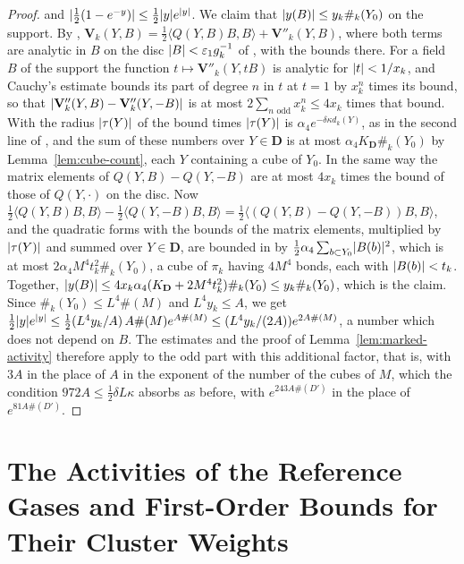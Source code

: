 \documentclass[11pt]{preprint}
\DeclarePairedDelimiter{\abs}{\lvert}{\rvert}
\numberwithin{equation}{section}
\theoremstyle{definition}
\theoremstyle{remark}
\theoremstyle{plain}
\begin{document}
\begin{proof}
and $\abs{\frac12(1 - e^{-y})} \leq \frac12\abs ye^{\abs y}$. We claim that $\abs{y(B)} \leq y_k\#_k(Y_0)$ on the support. By \cite[(1.42)]{BalabanRG2}, $\mathbf V_k(Y, B) = \frac12\langle Q(Y, B)B, B\rangle + \mathbf V''_k(Y, B)$, where both terms are analytic in $B$ on the disc $\abs B < \varepsilon_1g_k^{-1}$ of \cite[(1.34)]{BalabanRG2}, with the bounds \cite[(1.43), (1.36)]{BalabanRG2} there. For a field $B$ of the support the function $t \mapsto \mathbf V''_k(Y, tB)$ is analytic for $\abs t < 1/x_k$, and Cauchy's estimate bounds its part of degree $n$ in $t$ at $t = 1$ by $x_k^n$ times its bound, so that $\abs{\mathbf V''_k(Y, B) - \mathbf V''_k(Y, -B)}$ is at most $2\sum_{n \text{ odd}}x_k^n \leq 4x_k$ times that bound. With the radius $\abs{\tau(Y)}$ of \cite[(2.18)]{BalabanRG2} the bound \cite[(1.36)]{BalabanRG2} times $\abs{\tau(Y)}$ is $\alpha_4e^{-\delta\kappa d_k(Y)}$, as in the second line of \cite[(2.20)]{BalabanRG2}, and the sum of these numbers over $Y \in \mathbf D$ is at most $\alpha_4K_{\mathbf D}\#_k(Y_0)$ by Lemma~\ref{lem:cube-count}, each $Y$ containing a cube of $Y_0$. In the same way the matrix elements of $Q(Y, B) - Q(Y, -B)$ are at most $4x_k$ times the bound of those of $Q(Y, \cdot)$ on the disc. Now $\frac12\langle Q(Y, B)B, B\rangle - \frac12\langle Q(Y, -B)B, B\rangle = \frac12\langle(Q(Y, B) - Q(Y, -B))B, B\rangle$, and the quadratic forms with the bounds of the matrix elements, multiplied by $\abs{\tau(Y)}$ and summed over $Y \in \mathbf D$, are bounded in \cite[(2.19), (2.20)]{BalabanRG2} by $\frac12\alpha_4\sum_{b \subset Y_0}\abs{B(b)}^2$, which is at most $2\alpha_4M^4t_k^2\#_k(Y_0)$, a cube of $\pi_k$ having $4M^4$ bonds, each with $\abs{B(b)} < t_k$. Together, $\abs{y(B)} \leq 4x_k\alpha_4(K_{\mathbf D} + 2M^4t_k^2)\#_k(Y_0) \leq y_k\#_k(Y_0)$, which is the claim. Since $\#_k(Y_0) \leq L^4\#(M)$ and $L^4y_k \leq A$, we get $\frac12\abs ye^{\abs y} \leq \frac12(L^4y_k/A)\,A\#(M)e^{A\#(M)} \leq (L^4y_k/(2A))e^{2A\#(M)}$, a number which does not depend on $B$. The estimates \cite[(2.15)--(2.26)]{BalabanRG2} and the proof of Lemma~\ref{lem:marked-activity} therefore apply to the odd part with this additional factor, that is, with $3A$ in the place of $A$ in the exponent of the number of the cubes of $M$, which the condition $972A \leq \frac12\delta L\kappa$ absorbs as before, with $e^{243A\#(D')}$ in the place of $e^{81A\#(D')}$.
\end{proof}

\section[The Activities of the Reference Gases]{The Activities of the Reference Gases and First-Order Bounds for Their Cluster Weights}\label{sec:weights-large-fields}
\end{document}
